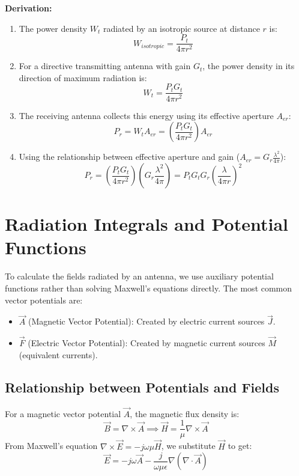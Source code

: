 \documentclass[12pt,a4paper]{article}
\begin{document}
\textbf{Derivation:}
\begin{enumerate}[label=\textbf{\arabic*.}, leftmargin=*, itemsep=3pt]
  \item The power density $W_t$ radiated by an isotropic source at distance $r$ is:
  \[
  W_{isotropic} = \frac{P_t}{4\pi r^2}
  \]
  \item For a directive transmitting antenna with gain $G_t$, the power density in its direction of maximum radiation is:
  \[
  W_t = \frac{P_t G_t}{4\pi r^2}
  \]
  \item The receiving antenna collects this energy using its effective aperture $A_{er}$:
  \[
  P_r = W_t A_{er} = \left( \frac{P_t G_t}{4\pi r^2} \right) A_{er}
  \]
  \item Using the relationship between effective aperture and gain ($A_{er} = G_r \frac{\lambda^2}{4\pi}$):
  \[
  P_r = \left( \frac{P_t G_t}{4\pi r^2} \right) \left( G_r \frac{\lambda^2}{4\pi} \right) = P_t G_t G_r \left( \frac{\lambda}{4\pi r} \right)^{\!2}
  \]
\end{enumerate}

\section{Radiation Integrals and Potential Functions}

To calculate the fields radiated by an antenna, we use auxiliary potential functions rather than solving Maxwell's equations directly. The most common vector potentials are:
\begin{itemize}[leftmargin=*, itemsep=3pt]
  \item $\vec{A}$ (Magnetic Vector Potential): Created by electric current sources $\vec{J}$.
  \item $\vec{F}$ (Electric Vector Potential): Created by magnetic current sources $\vec{M}$ (equivalent currents).
\end{itemize}

\subsection{Relationship between Potentials and Fields}
For a magnetic vector potential $\vec{A}$, the magnetic flux density is:
\[
\vec{B} = \nabla \times \vec{A} \implies \vec{H} = \frac{1}{\mu} \nabla \times \vec{A}
\]
From Maxwell's equation $\nabla \times \vec{E} = -j\omega\mu\vec{H}$, we substitute $\vec{H}$ to get:
\[
\vec{E} = -j\omega\vec{A} - \frac{j}{\omega\mu\epsilon}\nabla(\nabla \cdot \vec{A})
\]
\end{document}
